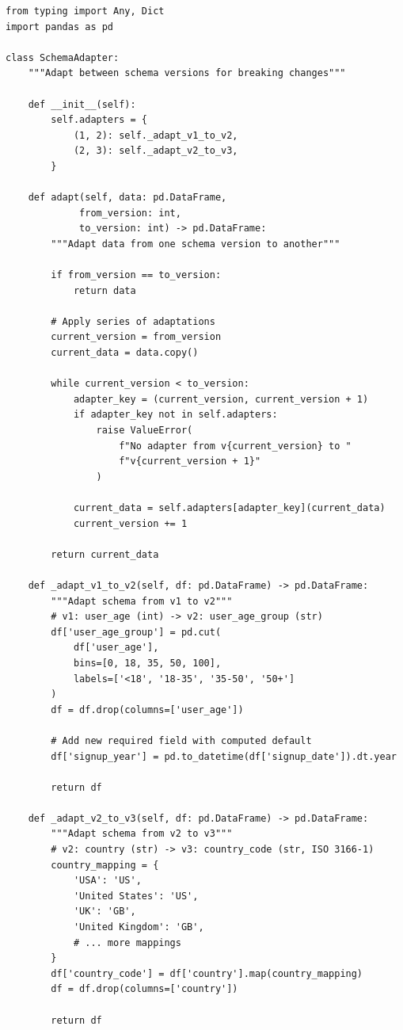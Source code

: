 \begin{lstlisting}[style=python, caption=Managing breaking schema changes]
from typing import Any, Dict
import pandas as pd

class SchemaAdapter:
    """Adapt between schema versions for breaking changes"""

    def __init__(self):
        self.adapters = {
            (1, 2): self._adapt_v1_to_v2,
            (2, 3): self._adapt_v2_to_v3,
        }

    def adapt(self, data: pd.DataFrame,
             from_version: int,
             to_version: int) -> pd.DataFrame:
        """Adapt data from one schema version to another"""

        if from_version == to_version:
            return data

        # Apply series of adaptations
        current_version = from_version
        current_data = data.copy()

        while current_version < to_version:
            adapter_key = (current_version, current_version + 1)
            if adapter_key not in self.adapters:
                raise ValueError(
                    f"No adapter from v{current_version} to "
                    f"v{current_version + 1}"
                )

            current_data = self.adapters[adapter_key](current_data)
            current_version += 1

        return current_data

    def _adapt_v1_to_v2(self, df: pd.DataFrame) -> pd.DataFrame:
        """Adapt schema from v1 to v2"""
        # v1: user_age (int) -> v2: user_age_group (str)
        df['user_age_group'] = pd.cut(
            df['user_age'],
            bins=[0, 18, 35, 50, 100],
            labels=['<18', '18-35', '35-50', '50+']
        )
        df = df.drop(columns=['user_age'])

        # Add new required field with computed default
        df['signup_year'] = pd.to_datetime(df['signup_date']).dt.year

        return df

    def _adapt_v2_to_v3(self, df: pd.DataFrame) -> pd.DataFrame:
        """Adapt schema from v2 to v3"""
        # v2: country (str) -> v3: country_code (str, ISO 3166-1)
        country_mapping = {
            'USA': 'US',
            'United States': 'US',
            'UK': 'GB',
            'United Kingdom': 'GB',
            # ... more mappings
        }
        df['country_code'] = df['country'].map(country_mapping)
        df = df.drop(columns=['country'])

        return df
\end{lstlisting}

